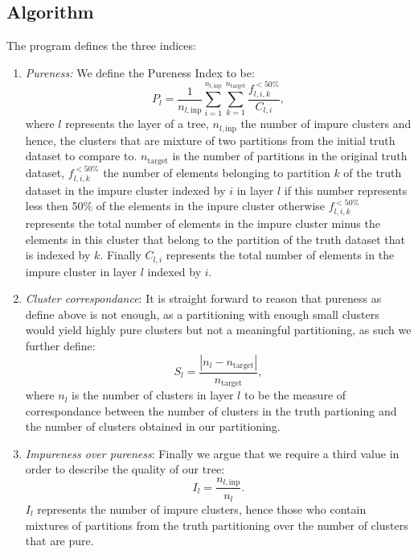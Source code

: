 \subsection{Algorithm}
The program defines the three indices:
\begin{enumerate}
\item \emph{Pureness:} We define the Pureness Index to be:
  \begin{equation}
    P_{l} =
    \frac{1}{n_{l,\mathrm{inp}}}
    \sum_{i=1}^{n_{l,\mathrm{inp}}}\sum_{k=1}^{n_{\mathrm{target}}}
    \frac{f_{l,i,k}^{<50\%}}{C_{l,i}},
    \label{eqn-pureness}
  \end{equation}
  where $l$ represents the layer of a tree, $n_{l,\mathrm{inp}}$ the
  number of impure clusters and hence, the clusters that are mixture of
  two partitions from the initial truth dataset to compare to.
  $n_{\mathrm{target}}$ is the number of partitions in the original
  truth dataset, $f_{l,i,k}^{<50\%}$ the number of elements
  belonging to partition $k$ of the truth dataset in the impure
  cluster indexed by $i$ in layer $l$ if this number represents less
  then 50\% of the elements in the inpure cluster otherwise
  $f_{l,i,k}^{<50\%}$ represents the total number of elements in the
  impure cluster minus the elements in this cluster that belong to
  the partition of the truth dataset that is indexed by $k$. Finally
  $C_{l,i}$ represents the total number of elements in the impure
  cluster in layer $l$ indexed by $i$.
\item \emph{Cluster correspondance}: It is straight forward to
  reason that pureness as define above is not enough, as a
  partitioning with enough small clusters would yield highly pure
  clusters but not a meaningful partitioning, as such we further
  define:
  \begin{equation}
    S_{l}=\frac{|n_{l}-n_{\mathrm{target}}|}{n_{\mathrm{target}}}, \label{eqn-c-corr}
  \end{equation}
  where $n_{l}$ is the number of clusters in layer $l$ to be the
  measure of correspondance between the number of clusters in the
  truth partioning and the number of clusters obtained in our
  partitioning.
\item \emph{Impureness over pureness}: Finally we argue that we require a
  third value in order to describe the quality of our tree:
  \begin{equation}
    I_{l}=\frac{n_{l,\mathrm{inp}}}{n_{l}}. \label{eqn-impure-pure}
  \end{equation}
  $I_{l}$ represents the number of impure clusters, hence those who
  contain mixtures of partitions from the truth partitioning over
  the number of clusters that are pure.
\end{enumerate}
